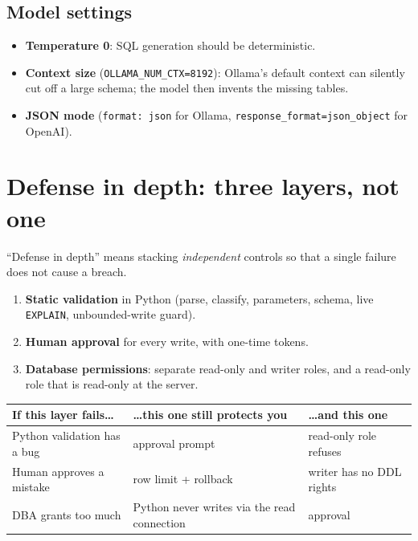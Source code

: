 \documentclass[11pt,a4paper]{article}
\begin{document}
\subsection*{Model settings}
\begin{itemize}[leftmargin=*]
  \item \textbf{Temperature 0}: SQL generation should be deterministic.
  \item \textbf{Context size} (\texttt{OLLAMA\_NUM\_CTX=8192}): Ollama's default
        context can silently cut off a large schema; the model then invents
        the missing tables.
  \item \textbf{JSON mode} (\texttt{format: json} for Ollama,
        \texttt{response\_format=json\_object} for OpenAI).
\end{itemize}

\section{Defense in depth: three layers, not one}

``Defense in depth'' means stacking \emph{independent} controls so that a
single failure does not cause a breach.

\begin{enumerate}[leftmargin=*]
  \item \textbf{Static validation} in Python (parse, classify, parameters,
        schema, live \texttt{EXPLAIN}, unbounded-write guard).
  \item \textbf{Human approval} for every write, with one-time tokens.
  \item \textbf{Database permissions}: separate read-only and writer roles,
        and a read-only role that is read-only at the server.
\end{enumerate}

\begin{center}
\begin{tabular}{@{}p{4.4cm}p{5.4cm}p{4.4cm}@{}}
\toprule
\textbf{If this layer fails\dots} & \textbf{\dots this one still protects you} & \textbf{\dots and this one} \\
\midrule
Python validation has a bug & approval prompt                & read-only role refuses \\
Human approves a mistake    & row limit + rollback           & writer has no DDL rights \\
DBA grants too much         & Python never writes via the read connection & approval \\
\bottomrule
\end{tabular}
\end{center}
\end{document}

